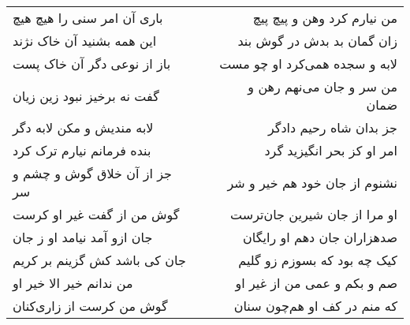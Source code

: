 \begin{center}
\begin{longtable}{l p{0.5cm} r}
\\
باری آن امر سنی را هیچ هیچ
&&
من نیارم کرد وهن و پیچ پیچ
\\
این همه بشنید آن خاک نژند
&&
زان گمان بد بدش در گوش بند
\\
باز از نوعی دگر آن خاک پست
&&
لابه و سجده همی‌کرد او چو مست
\\
گفت نه برخیز نبود زین زیان
&&
من سر و جان می‌نهم رهن و ضمان
\\
لابه مندیش و مکن لابه دگر
&&
جز بدان شاه رحیم دادگر
\\
بنده فرمانم نیارم ترک کرد
&&
امر او کز بحر انگیزید گرد
\\
جز از آن خلاق گوش و چشم و سر
&&
نشنوم از جان خود هم خیر و شر
\\
گوش من از گفت غیر او کرست
&&
او مرا از جان شیرین جان‌ترست
\\
جان ازو آمد نیامد او ز جان
&&
صدهزاران جان دهم او رایگان
\\
جان کی باشد کش گزینم بر کریم
&&
کیک چه بود که بسوزم زو گلیم
\\
من ندانم خیر الا خیر او
&&
صم و بکم و عمی من از غیر او
\\
گوش من کرست از زاری‌کنان
&&
که منم در کف او هم‌چون سنان
\\
\end{longtable}
\end{center}
